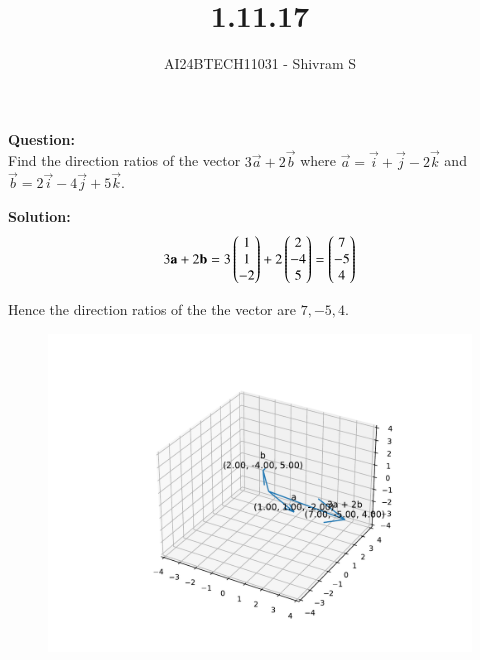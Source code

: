 \documentclass[journal]{IEEEtran}
\begin{document}

\vspace{3cm}

\title{1.11.17}
\author{AI24BTECH11031 - Shivram S
}
{\let\newpage\relax\maketitle}

\renewcommand{\thefigure}{\theenumi}
\renewcommand{\thetable}{\theenumi}
\setlength{\intextsep}{10pt} %


\renewcommand{\thetable}{\theenumi}


\textbf{Question: }\\
Find the direction ratios of the vector $3\vec{a} + 2\vec{b}$ where
$\vec{a} = \vec{i} + \vec{j} - 2\vec{k}$ and $\vec{b} = 2\vec{i} - 4\vec{j} + 5\vec{k}$.

\textbf{Solution: } \\

\begin{align}
3\mathbf{a} + 2\mathbf{b} = 3\begin{pmatrix}1 \\ 1 \\ -2\end{pmatrix} + 2\begin{pmatrix}2 \\ -4 \\ 5\end{pmatrix} = \begin{pmatrix}7 \\ -5 \\ 4\end{pmatrix}
\end{align}

Hence the direction ratios of the the vector are $7, -5, 4$.

\begin{figure}[h!]
    \centering
    \includegraphics[width=0.7\linewidth]{figs/fig.pdf}
\end{figure}
\end{document}
